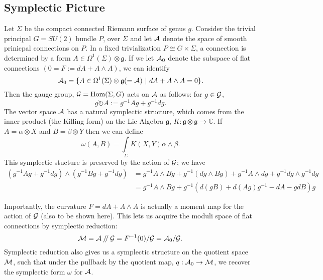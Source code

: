 	\subsection{Symplectic Picture}
	 Let $\Sigma$ be the compact connected Riemann surface of genus $g$. Consider the trivial principal $G=SU(2)$ bundle $P$, over $\Sigma$ and let $\mathcal{A}$ denote the space of smooth prinicpal connections on $P$. In a fixed trivialization $P \cong G\times \Sigma$, a connection is determined by a form $A \in \Omega^1(\Sigma)\otimes \mathfrak{g}$. If we let $\mathcal{A}_0$ denote the subspace of flat connections $(0 = F:=dA + A\wedge A)$, we can identify
	\begin{equation}
	\mathcal{A}_0 = \{A \in \Omega^1(\Sigma)\otimes\mathfrak{g} (=\mathcal{A}) ~|~ dA + A\wedge A = 0\}.
	\end{equation}
	Then the gauge group, $\mathcal{G} = \text{Hom}(\Sigma, G)$ acts on $\mathcal{A}$ as follows: for $g\in \mathcal{G}$,
	\begin{equation}
	g\circlearrowright A := g^{-1}Ag + g^{-1}dg.
	\end{equation}
	The vector space $\mathcal{A}$ has a natural symplectic structure, which comes from the inner product (the Killing form) on the Lie Algebra $\mathfrak{g}$, $K:\mathfrak{g}\otimes\mathfrak{g}\to\mathbb{C}$. If $A = \alpha \otimes X$ and $B = \beta \otimes Y$ then we can define
	\begin{equation}
	\omega(A,B) = \int\limits_\Sigma K(X,Y)\alpha\wedge \beta.
	\end{equation}
	This symplectic stucture is preserved by the action of $\mathcal{G}$; we have
	\begin{align*}
	(g^{-1} A g + g^{-1}dg) \wedge (g^{-1} B g + g^{-1}dg) &= g^{-1}A\wedge B g + g^{-1}(dg\wedge Bg) + g^{-1}A\wedge dg + g^{-1}dg \wedge g^{-1}dg \\
	&= g^{-1} A\wedge B g + g^{-1}(d(gB) + d(Ag)g^{-1} - dA - gdB)g
	\end{align*}
	
	Importantly, the curvature $F = dA + A\wedge A$ is actually a moment map for the action of $\mathcal{G}$ (also to be shown here). This lets us acquire the moduli space of flat connections by symplectic reduction:
	\begin{equation}
	\mathcal{M} = \mathcal{A}\mathbin{/\mkern-4mu/}\mathcal{G} = F^{-1}(0)/ \mathcal{G}= \mathcal{A}_0/ \mathcal{G}.
	\end{equation} 
	Symplectic reduction also gives us a symplectic structure on the quotient space $\mathcal{M}$, such that under the pullback by the quotient map, $q:\mathcal{A}_0 \to \mathcal{M}$, we recover the symplectic form $\omega$ for $\mathcal{A}$.


